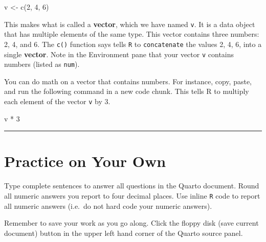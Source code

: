 \documentclass[
  letterpaper,
  DIV=11,
  numbers=noendperiod]{scrartcl}
\newenvironment{Shaded}{\begin{snugshade}}{\end{snugshade}}
\newcommand{\DecValTok}[1]{\textcolor[rgb]{0.68,0.00,0.00}{#1}}
\newcommand{\FunctionTok}[1]{\textcolor[rgb]{0.28,0.35,0.67}{#1}}
\newcommand{\NormalTok}[1]{\textcolor[rgb]{0.00,0.23,0.31}{#1}}
\newcommand{\OtherTok}[1]{\textcolor[rgb]{0.00,0.23,0.31}{#1}}
\newcommand{\SpecialCharTok}[1]{\textcolor[rgb]{0.37,0.37,0.37}{#1}}
\begin{document}
\begin{Shaded}
\begin{Highlighting}[]
\NormalTok{v }\OtherTok{\textless{}{-}} \FunctionTok{c}\NormalTok{(}\DecValTok{2}\NormalTok{, }\DecValTok{4}\NormalTok{, }\DecValTok{6}\NormalTok{)}
\end{Highlighting}
\end{Shaded}

This makes what is called a \textbf{vector}, which we have named
\texttt{v}. It is a data object that has multiple elements of the same
type. This vector contains three numbers: 2, 4, and 6. The \texttt{c()}
function says tells \texttt{R} to \texttt{concatenate} the values 2, 4,
6, into a single \textbf{vector}. Note in the Environment pane that your
vector \texttt{v} contains numbers (listed as \texttt{num}).

You can do math on a vector that contains numbers. For instance, copy,
paste, and run the following command in a new code chunk. This tells R
to multiply each element of the vector \texttt{v} by 3.

\begin{Shaded}
\begin{Highlighting}[]
\NormalTok{v }\SpecialCharTok{*} \DecValTok{3}
\end{Highlighting}
\end{Shaded}

\begin{center}\rule{0.5\linewidth}{0.5pt}\end{center}

\hypertarget{sec-practice-on-your-own}{%
\section{Practice on Your Own}\label{sec-practice-on-your-own}}

\begin{tcolorbox}[enhanced jigsaw, titlerule=0mm, toprule=.15mm, arc=.35mm, colbacktitle=quarto-callout-warning-color!10!white, coltitle=black, colframe=quarto-callout-warning-color-frame, left=2mm, breakable, bottomtitle=1mm, toptitle=1mm, bottomrule=.15mm, title=\textcolor{quarto-callout-warning-color}{\faExclamationTriangle}\hspace{0.5em}{Directions}, colback=white, rightrule=.15mm, opacityback=0, opacitybacktitle=0.6, leftrule=.75mm]

Type complete sentences to answer all questions in the Quarto document.
Round all numeric answers you report to four decimal places. Use inline
\texttt{R} code to report all numeric answers (i.e.~do not hard code
your numeric answers).

Remember to save your work as you go along. Click the floppy disk (save
current document) button in the upper left hand corner of the Quarto
source panel.

\end{tcolorbox}
\end{document}
